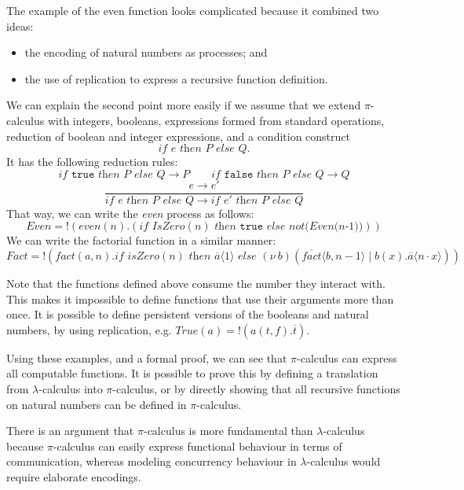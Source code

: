 \documentclass[a4paper, openany]{memoir}
\theoremstyle{definition}
\begin{document}
    The example of the even function looks complicated because it combined two ideas:
    \begin{itemize}
        \item the encoding of natural numbers as processes; and
        \item the use of replication to express a recursive function definition.
    \end{itemize}
    We can explain the second point more easily if we assume that we extend $\pi$-calculus with integers, booleans, expressions formed from standard operations, reduction of boolean and integer expressions, and a condition construct
    \[\textit{if } e \textit{ then } P \textit{ else } Q.\]
    It has the following reduction rules:
    \[\textit{if } \texttt{true} \textit{ then } P \textit{ else } Q \to P \qquad \textit{if } \texttt{false} \textit{ then } P \textit{ else } Q \to Q \]
    \[\frac{e \to e'}{\textit{if } e \textit{ then } P \textit{ else } Q \to \textit{if } e' \textit{ then } P \textit{ else } Q}\]
    That way, we can write the \textit{even} process as follows:
    \[\textit{Even} = !(
        \textit{even}(n).(\textit{if IsZero}(n)\textit{ then }\texttt{true} \textit{ else not(Even(n-1))})
    )\]
    We can write the factorial function in a similar manner:
    \[\textit{Fact} = !(
        \textit{fact}(a, n).\textit{if isZero}(n)\textit{ then }\overline{a} \langle 1 \rangle 
        \textit{ else }(\nu \ b)(\overline{\textit{fact}} \langle b, n-1 \rangle \mid b(x).\overline{a} \langle n \cdot x \rangle)
    )\]

    Note that the functions defined above consume the number they interact with. This makes it impossible to define functions that use their arguments more than once. It is possible to define persistent versions of the booleans and natural numbers, by using replication, e.g. $\textit{True}(a) = !(a(t, f).\overline{t})$.

    Using these examples, and a formal proof, we can see that $\pi$-calculus can express all computable functions. It is possible to prove this by defining a translation from $\lambda$-calculus into $\pi$-calculus, or by directly showing that all recursive functions on natural numbers can be defined in $\pi$-calculus.

    There is an argument that $\pi$-calculus is more fundamental than $\lambda$-calculus because $\pi$-calculus can easily express functional behaviour in terms of communication, whereas modeling concurrency behaviour in $\lambda$-calculus would require elaborate encodings.
    \newpage
\end{document}
